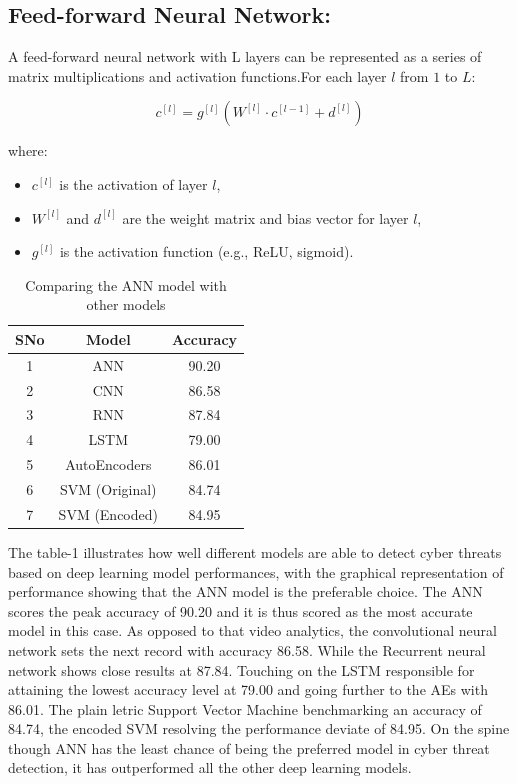 \documentclass{llncs}
\begin{document}
\subsection{Feed-forward Neural Network:}
A feed-forward neural network with L layers can be represented as a series of matrix multiplications and activation functions.For each layer $l$ from $1$ to $L$:

\begin{equation}
c^{[l]} = g^{[l]}(W^{[l]} \cdot c^{[l-1]} + d^{[l]})
\end{equation}

where:
\begin{itemize}
    \item $c^{[l]}$ is the activation of layer $l$,
    \item $W^{[l]}$ and $d^{[l]}$ are the weight matrix and bias vector for layer $l$,
    \item $g^{[l]}$ is the activation function (e.g., ReLU, sigmoid).
\end{itemize}
\begin{table}[htbp]
\caption{Comparing the ANN model with other models}
\centering
\begin{tabular}{|c|c|c|}
        \hline
        SNo & Model & Accuracy \\ \hline
        1 & ANN & 90.20 \\ \hline
        2 & CNN & 86.58 \\ \hline
         3& RNN & 87.84 \\ \hline
        4 & LSTM & 79.00 \\ \hline
        5 & AutoEncoders & 86.01 \\ \hline
        6 & SVM (Original) & 84.74 \\ \hline
        7 & SVM (Encoded) & 84.95 \\ \hline
\end{tabular}
\label{tab 1}
\end{table}
The table-1 illustrates how well different models are able to detect cyber threats based on deep learning model performances, with the graphical representation of performance showing that the ANN model is the preferable choice. The ANN scores the peak accuracy of 90.20 and it is thus scored as the most accurate model in this case. As opposed to that video analytics, the convolutional neural network sets the next record with accuracy 86.58. While the Recurrent neural network shows close results at 87.84. Touching on the LSTM responsible for attaining the lowest accuracy level at 79.00 and going further to the AEs with 86.01. The plain letric Support Vector Machine benchmarking an accuracy of 84.74, the encoded SVM resolving the performance deviate of 84.95. On the spine though ANN has the least chance of being the preferred model in cyber threat detection, it has outperformed all the other deep learning models.
\end{document}
